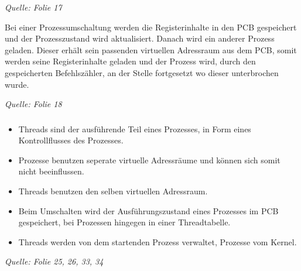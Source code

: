 \documentclass[a4paper]{article}
\newenvironment{quelle}{\medskip \noindent\itshape Quelle: }{\bigskip}
\begin{document}
\begin{quelle}
  Folie 17
\end{quelle}

Bei einer Prozessumschaltung werden die Registerinhalte in den PCB gespeichert und der Prozesszustand wird aktualisiert.
Danach wird ein anderer Prozess geladen. Dieser erhält sein passenden virtuellen Adressraum aus dem PCB, somit werden 
seine Registerinhalte geladen und der Prozess wird, durch den gespeicherten Befehlszähler, an der Stelle fortgesetzt wo dieser
unterbrochen wurde.

\begin{quelle}
  Folie 18
\end{quelle}

\subsubsection{}
\begin{itemize}
  \item Threads sind der ausführende Teil eines Prozesses, in Form eines Kontrollflusses des Prozesses.
  \item Prozesse benutzen seperate virtuelle Adressräume und können sich somit nicht beeinflussen.
  \item Threads benutzen den selben virtuellen Adressraum.
  \item Beim Umschalten wird der Ausführungszustand eines Prozesses im PCB gespeichert, bei Prozessen hingegen in einer Threadtabelle.
  \item Threads werden von dem startenden Prozess verwaltet, Prozesse vom Kernel.
\end{itemize}
\begin{quelle}
  Folie 25, 26, 33, 34 
\end{quelle}
\subsection{}
\end{document}
